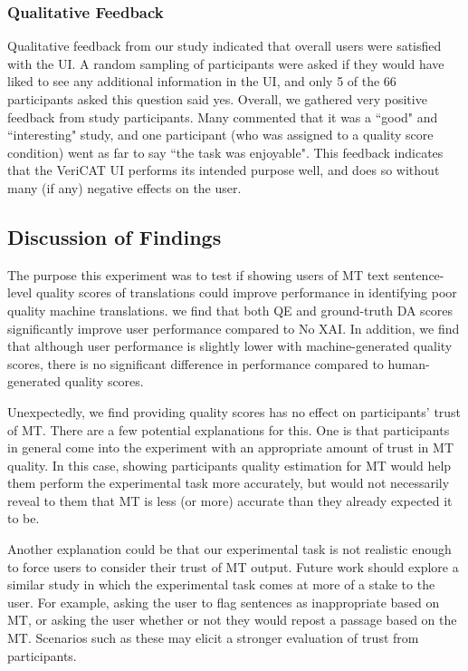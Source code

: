 \subsubsection{Qualitative Feedback}

Qualitative feedback from our study indicated that overall users were satisfied with the UI. A random sampling of participants were asked if they would have liked to see any additional information in the UI, and only 5 of the 66 participants asked this question said yes. Overall, we gathered very positive feedback from study participants. Many commented that it was a ``good" and ``interesting" study, and one participant (who was assigned to a quality score condition) went as far to say ``the task was enjoyable". This feedback indicates that the VeriCAT UI performs its intended purpose well, and does so without many (if any) negative effects on the user.       

\subsection{Discussion of Findings} 

The purpose this experiment was to test if showing users of MT text sentence-level quality scores of translations could improve performance in identifying poor quality machine translations. we find that both QE and ground-truth DA scores significantly improve user performance compared to No XAI. 
In addition, we find that although user performance is slightly lower with machine-generated quality scores, there is no significant difference in performance compared to human-generated quality scores. 

Unexpectedly, we find providing quality scores has no effect on participants' trust of MT. There are a few potential explanations for this. One is that participants in general come into the experiment with an appropriate amount of trust in MT quality. In this case, showing participants quality estimation for MT would help them perform the experimental task more accurately, but would not necessarily reveal to them that MT is less (or more) accurate than they already expected it to be. 

Another explanation could be that our experimental task is not realistic enough to force users to consider their trust of MT output. Future work should explore a similar study in which the experimental task comes at more of a stake to the user. For example, asking the user to flag sentences as inappropriate based on MT, or asking the user whether or not they would repost a passage based on the MT. Scenarios such as these may elicit a stronger evaluation of trust from participants.

